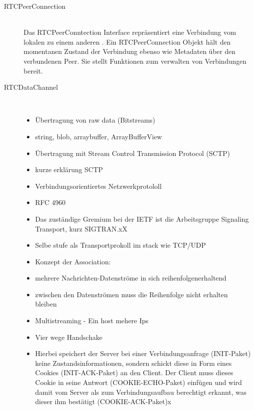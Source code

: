 \begin{description}
\item[RTCPeerConnection]\hfill \\
Das RTCPeerConntection Interface repräsentiert eine Verbindung vom lokalen \client zu einem anderen \client. Ein RTCPeerConnection Objekt hält den momentanen Zustand der Verbindung ebenso wie Metadaten über den verbundenen Peer. Sie stellt Funktionen zum verwalten von Verbindungen bereit.



\item[RTCDataChannel]\hfill \\
\begin{itemize}
	\item Übertragung von raw data (Bitstreams)
	\item string, blob, arraybuffer, ArrayBufferView
	\item Übertragung mit Stream Control Transmission Protocol (SCTP)
	\item kurze erklärung SCTP
	\item 	Verbindungsorientiertes Netzwerkprotololl
	\item 	 RFC 4960
	\item 	Das zuständige Gremium bei der IETF ist die Arbeitsgruppe Signaling Transport, kurz SIGTRAN.xX
	\item 	Selbe stufe als Transportprokoll im stack wie TCP/UDP
	\item 	Konzept der Association: 
	\item 		mehrere Nachrichten-Datenströme in sich reihenfolgenerhaltend
	\item 		zwischen den Datenströmen muss die Reihenfolge nicht erhalten bleiben
	\item 	Multistreaming - Ein host mehere Ips
	\item 	Vier wege Handschake
	\item 		Hierbei speichert der Server bei einer Verbindungsanfrage (INIT-Paket) keine Zustandsinformationen, sondern schickt diese in Form eines Cookies (INIT-ACK-Paket) an den Client. Der Client muss dieses Cookie in seine Antwort (COOKIE-ECHO-Paket) einfügen und wird damit vom Server als zum Verbindungsaufbau berechtigt erkannt, was dieser ihm bestätigt (COOKIE-ACK-Paket)x
\end{itemize}


\end{description}
